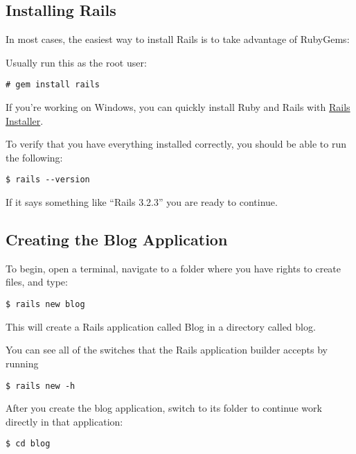 \documentclass[10pt]{book}
\begin{document}
\subsection{ Installing Rails}

In most cases, the easiest way to install Rails is to take advantage of RubyGems:

Usually run this as the root user:
\begin{verbatim}
# gem install rails
\end{verbatim}

If you’re working on Windows, you can quickly install Ruby and Rails with \href{http://railsinstaller.org/}{Rails Installer}.

To verify that you have everything installed correctly, you should be able to run the following:
\begin{verbatim}
$ rails --version
\end{verbatim}

If it says something like “Rails 3.2.3” you are ready to continue.

\subsection{ Creating the Blog Application}

To begin, open a terminal, navigate to a folder where you have rights to create files, and type:
\begin{verbatim}
$ rails new blog
\end{verbatim}

This will create a Rails application called Blog in a directory called blog.

You can see all of the switches that the Rails application builder accepts by running

\begin{verbatim}
$ rails new -h
\end{verbatim}

After you create the blog application, switch to its folder to continue work directly in that application:
\begin{verbatim}
$ cd blog
\end{verbatim}
\end{document}
